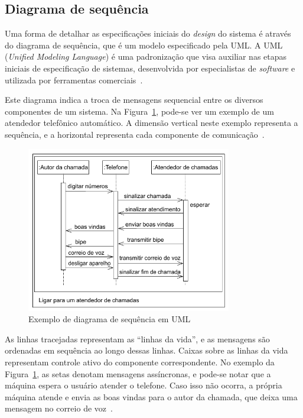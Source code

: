 \subsection{Diagrama de sequência}
Uma forma de detalhar as especificações iniciais do \textit{design} do sistema é através do diagrama de sequência, que é um modelo especificado pela UML. A UML (\textit{Unified Modeling Language}) é uma padronização que visa auxiliar nas etapas iniciais de especificação de sistemas, desenvolvida por especialistas de \textit{software} e utilizada por ferramentas comerciais~\cite{marwedel:2010}.

Este diagrama indica a troca de mensagens sequencial entre os diversos componentes de um sistema. Na Figura~\ref{fig:seq_chart}, pode-se ver um exemplo de um atendedor telefônico automático. A dimensão vertical neste exemplo representa a sequência, e a horizontal representa cada componente de comunicação~\cite{marwedel:2010}.

\begin{figure}[!ht]
	\caption{\label{fig:seq_chart}Exemplo de diagrama de sequência em UML}
	\begin{center}
	    \includegraphics[width=0.8\textwidth]{resources/seq_chart_marwedel_1}
	\end{center}
\end{figure}

As linhas tracejadas representam as ``linhas da vida'', e as mensagens são ordenadas em sequência ao longo dessas linhas. Caixas sobre as linhas da vida representam controle ativo do componente correspondente. No exemplo da Figura~\ref{fig:seq_chart}, as setas denotam mensagens assíncronas, e pode-se notar que a máquina espera o usuário atender o telefone. Caso isso não ocorra, a própria máquina atende e envia as boas vindas para o autor da chamada, que deixa uma mensagem no correio de voz~\cite{marwedel:2010}.

